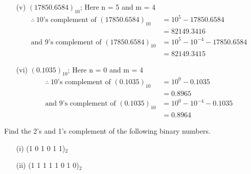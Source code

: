 \begin{solution}
\begin{itemize}
\item[(v)] $(17850.6584)_{10}$\qquad ; Here n = 5 and m = 4
\begin{align*}
\therefore~ \text{10's complement of } (17850.6584)_{10} &= 10^{5}-17850.6584\\[3pt]
&= 82149.3416\\[3pt]
\text{and 9's complement of } (17850.6584)_{10} &= 10^{5}-10^{-4}-17850.6584\\[3pt]
&= 82149.3415
\end{align*}

\item[(vi)] $(0.1035)_{10}$\qquad ; Here n = 0 and m = 4
\begin{align*}
\therefore~ \text{10's complement of } (0.1035)_{10} &= 10^{0}-0.1035\\[3pt]
&= 0.8965\\[3pt]
\text{and 9's complement of } (0.1035)_{10} &= 10^{0}-10^{-4}-0.1035\\[3pt]
&= 0.8964
\end{align*}
\end{itemize}
\end{solution}

\begin{problem}\label{prob5.24}
Find the 2's and 1's complement of the following binary numbers.
\begin{itemize}
\item[(i)] (1 0 1 0 1 1)$_{2}$

\item[(ii)] (1 1 1 1 1 0 1 0)$_{2}$
\end{itemize}
\end{problem}

